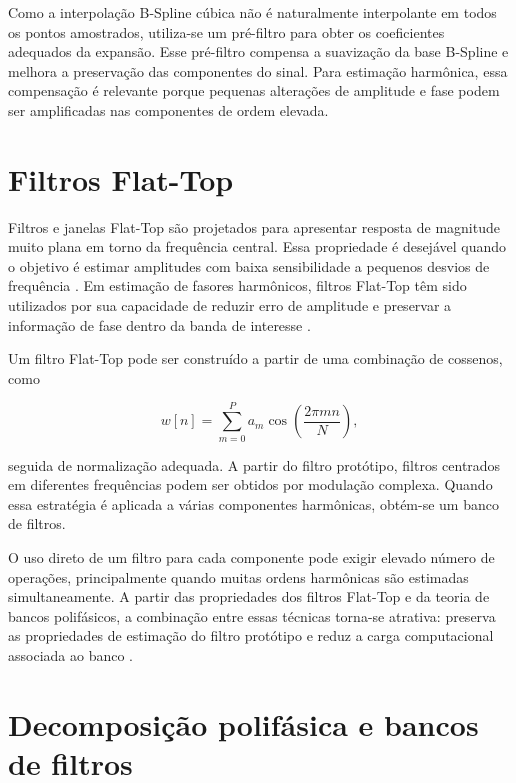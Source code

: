Como a interpolação B-Spline cúbica não é naturalmente interpolante em todos os pontos amostrados, utiliza-se um pré-filtro para obter os coeficientes adequados da expansão. Esse pré-filtro compensa a suavização da base B-Spline e melhora a preservação das componentes do sinal. Para estimação harmônica, essa compensação é relevante porque pequenas alterações de amplitude e fase podem ser amplificadas nas componentes de ordem elevada.

\section{Filtros Flat-Top}

Filtros e janelas Flat-Top são projetados para apresentar resposta de magnitude muito plana em torno da frequência central. Essa propriedade é desejável quando o objetivo é estimar amplitudes com baixa sensibilidade a pequenos desvios de frequência \cite{harris78,duda2016}. Em estimação de fasores harmônicos, filtros Flat-Top têm sido utilizados por sua capacidade de reduzir erro de amplitude e preservar a informação de fase dentro da banda de interesse \cite{duda2016,duda2019}.

Um filtro Flat-Top pode ser construído a partir de uma combinação de cossenos, como

\begin{equation}
w[n] = \sum_{m=0}^{P} a_m \cos\left(\frac{2\pi mn}{N}\right),
\label{eq:cap2_flattop}
\end{equation}

\noindent seguida de normalização adequada. A partir do filtro protótipo, filtros centrados em diferentes frequências podem ser obtidos por modulação complexa. Quando essa estratégia é aplicada a várias componentes harmônicas, obtém-se um banco de filtros.

O uso direto de um filtro para cada componente pode exigir elevado número de operações, principalmente quando muitas ordens harmônicas são estimadas simultaneamente. A partir das propriedades dos filtros Flat-Top e da teoria de bancos polifásicos, a combinação entre essas técnicas torna-se atrativa: preserva as propriedades de estimação do filtro protótipo e reduz a carga computacional associada ao banco \cite{duda2019,mk06}.

\section{Decomposição polifásica e bancos de filtros}

